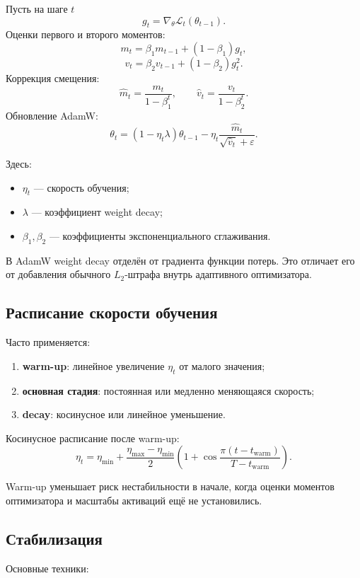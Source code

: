 \documentclass[12pt,a4paper]{article}
\newcommand{\1}{\mathbf{1}}
\theoremstyle{definition}
\theoremstyle{remark}
\begin{document}
Пусть на шаге $t$
\[
g_t=\nabla_\theta\mathcal{L}_t(\theta_{t-1}).
\]
Оценки первого и второго моментов:
\[
m_t=\beta_1m_{t-1}+(1-\beta_1)g_t,
\]
\[
v_t=\beta_2v_{t-1}+(1-\beta_2)g_t^2.
\]
Коррекция смещения:
\[
\widehat{m}_t=\frac{m_t}{1-\beta_1^t},
\qquad
\widehat{v}_t=\frac{v_t}{1-\beta_2^t}.
\]
Обновление AdamW:
\[
\theta_t
=
(1-\eta_t\lambda)\theta_{t-1}
-
\eta_t
\frac{\widehat{m}_t}
{\sqrt{\widehat{v}_t}+\varepsilon}.
\]

Здесь:

\begin{itemize}
    \item $\eta_t$ --- скорость обучения;
    \item $\lambda$ --- коэффициент weight decay;
    \item $\beta_1,\beta_2$ --- коэффициенты экспоненциального сглаживания.
\end{itemize}

В AdamW weight decay отделён от градиента функции потерь. Это отличает
его от добавления обычного $L_2$-штрафа внутрь адаптивного оптимизатора.

\subsection{Расписание скорости обучения}

Часто применяется:

\begin{enumerate}
    \item \textbf{warm-up}: линейное увеличение $\eta_t$ от малого
    значения;
    \item \textbf{основная стадия}: постоянная или медленно меняющаяся
    скорость;
    \item \textbf{decay}: косинусное или линейное уменьшение.
\end{enumerate}

Косинусное расписание после warm-up:
\[
\eta_t
=
\eta_{\min}
+
\frac{\eta_{\max}-\eta_{\min}}{2}
\left(
1+\cos\frac{\pi(t-t_{\mathrm{warm}})}
{T-t_{\mathrm{warm}}}
\right).
\]

Warm-up уменьшает риск нестабильности в начале, когда оценки моментов
оптимизатора и масштабы активаций ещё не установились.

\subsection{Стабилизация}

Основные техники:
\end{document}
